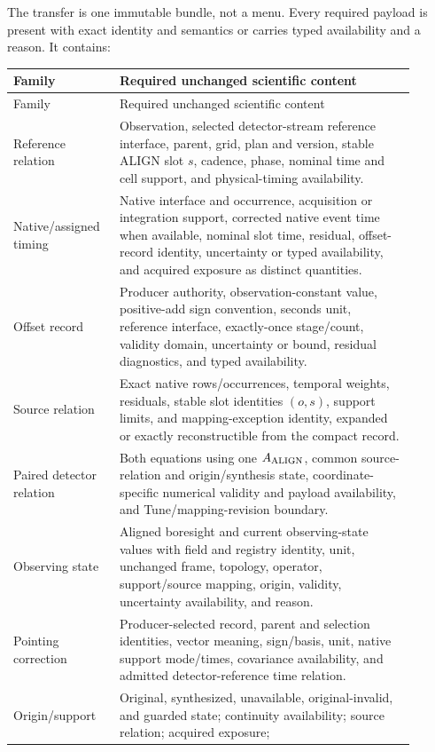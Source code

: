 The transfer is one immutable bundle, not a menu.  Every required payload is
present with exact identity and semantics or carries typed availability and a
reason.  It contains:

\begin{longtable}{L{0.22\linewidth}L{0.68\linewidth}}
\toprule
Family & Required unchanged scientific content\\
\midrule
\endfirsthead
\toprule
Family & Required unchanged scientific content\\
\midrule
\endhead
Reference relation & Observation, selected detector-stream reference
interface, parent, grid, plan and version, stable ALIGN slot \(s\), cadence, phase,
nominal time and cell support, and physical-timing availability.\\
Native/assigned timing & Native interface and occurrence, acquisition or
integration support, corrected native event time when available, nominal slot
time, residual, offset-record identity, uncertainty or typed availability, and
acquired exposure as distinct quantities.\\
Offset record & Producer authority, observation-constant value, positive-add
sign convention, seconds unit, reference interface, exactly-once stage/count,
validity domain, uncertainty or bound, residual diagnostics, and typed
availability.\\
Source relation & Exact native rows/occurrences, temporal weights, residuals,
stable slot identities \((o,s)\), support limits, and mapping-exception identity, expanded or
exactly reconstructible from the compact record.\\
Paired detector relation & Both equations using one \(A_{\rm ALIGN}\), common
source-relation and origin/synthesis state, coordinate-specific numerical
validity and payload availability, and Tune/mapping-revision boundary.\\
Observing state & Aligned boresight and current observing-state values with
field and registry identity, unit, unchanged frame, topology, operator,
support/source mapping, origin, validity, uncertainty availability, and
reason.\\
Pointing correction & Producer-selected record, parent and selection
identities, vector meaning, sign/basis, unit, native support mode/times,
covariance availability, and admitted detector-reference time relation.\\
Origin/support & Original, synthesized, unavailable, original-invalid, and
guarded state; continuity availability; source relation; acquired exposure;

\end{longtable}
